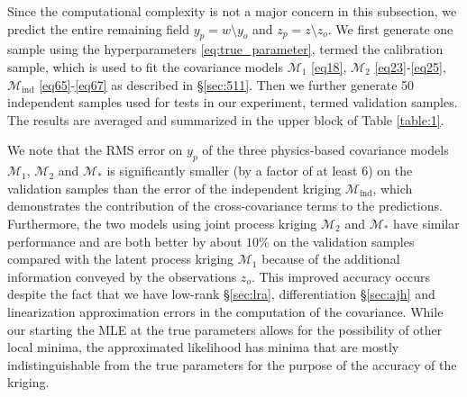 \documentclass[article,ij4uq]{ij4uq}              %
\begin{document}
Since the computational complexity is not a major concern in this subsection, we predict the entire remaining field $y_{p}=w\setminus y_{o}$ and $z_{p}=z\setminus z_{o}$. We first generate one sample using the hyperparameters \eqref{eq:true_parameter}, termed the calibration sample, which is used to fit the covariance models $\mathcal{M}_{1}$ \eqref{eq18}, $\mathcal{M}_{2}$ \eqref{eq23}-\eqref{eq25},$\mathcal{M}_{\mathrm{ind}}$ \eqref{eq65}-\eqref{eq67} as described in \S \ref{sec:511}. Then we further generate 50 independent samples used for tests in our experiment, termed validation samples. The results are averaged and summarized in the upper block of Table \ref{table:1}.

\par We note that the RMS error on $y_p$ of the three physics-based covariance models $\mathcal{M}_{1}$, $\mathcal{M}_{2}$ and $\mathcal{M}_{*}$ is significantly smaller (by a factor of at least 6) on the validation samples than the error of the independent kriging $\mathcal{M}_{\mathrm{ind}}$, which demonstrates the contribution of the cross-covariance terms to the predictions. Furthermore, the two models using joint process kriging $\mathcal{M}_{2}$ and $\mathcal{M}_{*}$ have similar performance and are both better by about $10\%$ on the validation samples compared with the latent process kriging $\mathcal{M}_{1}$ because of the additional information conveyed by the observations $z_{o}$. This improved accuracy occurs despite the fact that we have low-rank \S \ref{sec:lra},  differentiation \S \ref{sec:ajh} and linearization approximation errors in the computation of the covariance. While our starting the MLE at the true parameters allows for the possibility of other local minima,  the approximated likelihood has minima that are mostly indistinguishable from the true parameters for the purpose of the accuracy of the kriging. 
\end{document}
